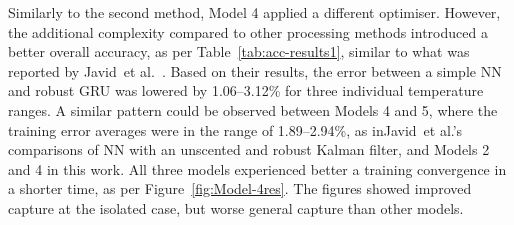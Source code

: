 %
%
Similarly to the second method, Model 4 applied a different optimiser.
However, the additional complexity compared to other processing methods introduced a better overall accuracy, as per \mbox{Table~\ref{tab:acc-results1}}, similar to what was reported by Javid~et al.~\cite{javid_adaptive_2020}.
Based on their results, the error between a simple NN and robust GRU was lowered by 1.06--3.12\% for three individual temperature ranges.
A similar pattern could be observed between Models 4 and 5, where the training error averages were in the range of 1.89--2.94\%, as in\linebreak  Javid~et al.'s~\cite{javid_adaptive_2020} comparisons of NN with an unscented and robust Kalman filter, and Models 2 and 4 in this work.
All three models experienced better a training convergence in a shorter time, as per Figure~\ref{fig:Model-4res}.
The figures showed improved capture at the isolated case, but worse general capture than other models.

